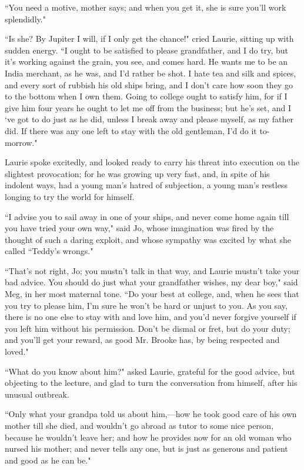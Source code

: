 ``You need a motive, mother says; and when you get it, she is sure
you'll work splendidly."

``Is she? By Jupiter I will, if I only get the chance!" cried Laurie,
sitting up with sudden energy. ``I ought to be satisfied to please
grandfather, and I do try, but it's working against the
grain, you see, and comes hard. He wants me to be an India merchant, as
he was, and I'd rather be shot. I hate tea and silk and
spices, and every sort of rubbish his old ships bring, and I
don't care how soon they go to the bottom when I own
them. Going to college ought to satisfy him, for if I give him four
years he ought to let me off from the business; but he's
set, and I `ve got to do just as he did, unless I break
away and please myself, as my father did. If there was any one left to
stay with the old gentleman, I'd do it to-morrow."

Laurie spoke excitedly, and looked ready to carry his threat into
execution on the slightest provocation; for he was growing up very fast,
and, in spite of his indolent ways, had a young man's
hatred of subjection, a young man's restless longing to
try the world for himself.

``I advise you to sail away in one of your ships, and never come home
again till you have tried your own way," said Jo, whose imagination was
fired by the thought of such a daring exploit, and whose sympathy was
excited by what she called ``Teddy's wrongs."

``That's not right, Jo; you mustn't talk
in that way, and Laurie mustn't take your bad advice.
You should do just what your grandfather wishes, my dear boy," said Meg,
in her most maternal tone. ``Do your best at college, and, when he sees
that you try to please him, I'm sure he
won't be hard or unjust to you. As you say, there is no
one else to stay with and love him, and you'd never
forgive yourself if you left him without his permission.
Don't be dismal or fret, but do your duty; and
you'll get your reward, as good Mr. Brooke has, by being
respected and loved."

``What do you know about him?" asked Laurie, grateful for the good
advice, but objecting to the lecture, and glad to turn the conversation
from himself, after his unusual outbreak.

``Only what your grandpa told us about him,---how he took good care of
his own mother till she died, and wouldn't go abroad as
tutor to some nice person, because he wouldn't leave
her; and how he provides now for an old woman who nursed his mother; and
never tells any one, but is just as generous and patient and good as he
can be."

